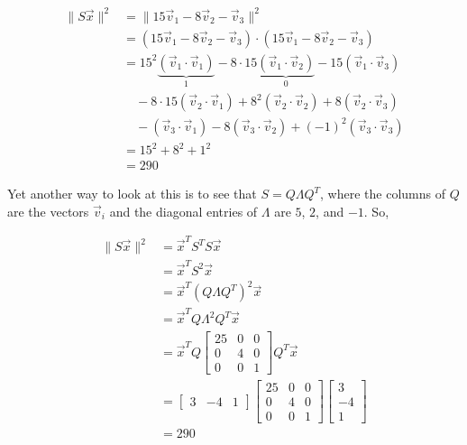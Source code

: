 \documentclass[11pt]{article}
\begin{document}
\begin{prob}[(10 pts)]
\begin{subprob}
\begin{solution}
\begin{align*}
\lVert S\vec x \rVert^2 &= \lVert 15\vec v_1 - 8\vec v_2 - \vec v_3 \rVert^2 \\
&= (15 \vec v_1 - 8\vec v_2 - \vec v_3) \cdot (15\vec v_1 - 8\vec v_2 - \vec v_3) \\
&= 15^2 \underbrace{(\vec v_1 \cdot \vec v_1)}_{1} - 8 \cdot 15 \underbrace{(\vec v_1 \cdot \vec v_2)}_{0} - 15 (\vec v_1 \cdot \vec v_3) \\
& \quad - 8 \cdot 15 (\vec v_2 \cdot \vec v_1) + 8^2 (\vec v_2 \cdot \vec v_2) + 8 (\vec v_2 \cdot \vec v_3) \\
& \quad - (\vec v_3 \cdot \vec v_1) - 8 (\vec v_3 \cdot \vec v_2) + (-1)^2(\vec v_3 \cdot \vec v_3) \\
&= 15^2 + 8^2 + 1^2 \\
&= 290
\end{align*}

Yet another way to look at this is to see that $S = Q \Lambda Q^T$, where the columns of $Q$ are the vectors $\vec v_i$ and the diagonal entries of $\Lambda$ are $5$, $2$, and $-1$. So,

\begin{align*}
\lVert S\vec x \rVert^2 
  &= \vec x^T S^T S \vec x \\
  &= \vec x^T S^2 \vec x \\
  &= \vec x^T (Q \Lambda Q^T)^2 \vec x \\
  &= \vec x^T Q \Lambda^2 Q^T \vec x \\
  &= \vec x^T Q 
    \begin{bmatrix}
      25 & 0 & 0 \\
      0 & 4 & 0 \\
      0 & 0 & 1
    \end{bmatrix}
    Q^T \vec x \\
  &= \begin{bmatrix} 3 & -4 & 1 \end{bmatrix}
  \begin{bmatrix}
    25 & 0 & 0 \\
    0 & 4 & 0 \\
    0 & 0 & 1
  \end{bmatrix}
  \begin{bmatrix} 3 \\ -4 \\ 1 \end{bmatrix} \\
  &= \boxed{290} 
\end{align*}


\end{solution}
\end{subprob}
\end{prob}
\end{document}
